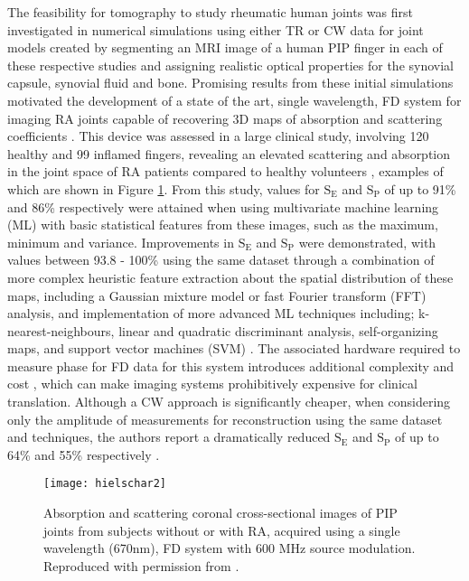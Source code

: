 \documentclass[twoside]{bhamthesis}
\theoremstyle{definition}
\begin{document}
The feasibility for tomography to study rheumatic human joints was first investigated in numerical simulations using either TR \cite{klose1998} or CW \cite{netz2001imaging} data for joint models created by segmenting an MRI image of a human PIP finger in each of these respective studies and assigning realistic optical properties for the synovial capsule, synovial fluid and bone. Promising results from these initial simulations motivated the development of a state of the art, single wavelength, FD system for imaging RA joints capable of recovering 3D maps of absorption and scattering coefficients \cite{hielscher2004sagittal,netz2008multipixel}. This device was assessed in a large clinical study, involving 120 healthy and 99 inflamed fingers, revealing an elevated scattering and absorption in the joint space of RA patients compared to healthy volunteers \cite{hielscher2011frequency}, examples of which are shown in Figure \ref{fig:Hielschar_results}. From this study, values for $\mathrm{S_E}$ and $\mathrm{S_P}$ of up to 91\% and 86\% respectively were attained when using multivariate machine learning (ML) with basic statistical features from these images, such as the maximum, minimum and variance. Improvements in $\mathrm{S_E}$ and $\mathrm{S_P}$ were demonstrated, with values between 93.8 - 100\% \cite{montejo2013computer2} using the same dataset through a combination of more complex heuristic feature extraction about the spatial distribution of these maps, including a Gaussian mixture model or fast Fourier transform (FFT) analysis, and implementation of more advanced ML techniques including; k-nearest-neighbours, linear and quadratic discriminant analysis, self-organizing maps, and support vector machines (SVM) \cite{montejo2013computer}. The associated hardware required to measure phase for FD data for this system introduces additional complexity and cost \cite{netz2008multipixel}, which can make imaging systems prohibitively expensive for clinical translation. Although a CW approach is significantly cheaper, when considering only the amplitude of measurements for reconstruction using the same dataset and techniques, the authors report a dramatically reduced $\mathrm{S_E}$ and $\mathrm{S_P}$ of up to 64\% and 55\% respectively \cite{montejo2013computer2}.

\begin{figure}[!ht]
\texttt{[image: hielschar2]}
\centering
\caption{Absorption and scattering coronal cross-sectional images of PIP joints from subjects without or with RA, acquired using a single wavelength (670nm), FD system with 600 MHz source modulation. Reproduced with permission from \cite{hielscher2011frequency}.}
\centering
\label{fig:Hielschar_results}
\end{figure} 
\end{document}
